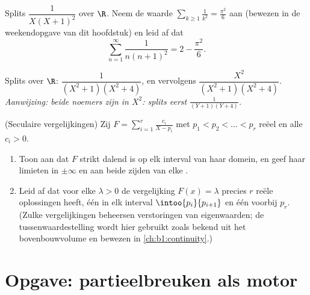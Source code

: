 \begin{exercise}[$\star\star$]\label{exo:b1:fractions:10}
Splits $\dfrac{1}{X(X+1)^2}$ over $\R$. Neem de waarde $\sum_{k \geq 1}
\frac1{k^2} = \frac{\pi^2}6$ aan (bewezen in de weekendopgave van dit
hoofdstuk) en leid af dat
\[
\sum_{n=1}^{\infty} \frac{1}{n(n+1)^2} = 2 - \frac{\pi^2}{6} .
\]
\end{exercise}

\begin{exercise}[$\star\star$]\label{exo:b1:fractions:11}
Splits over $\R$: $\dfrac{1}{(X^2+1)(X^2+4)}$, en vervolgens
$\dfrac{X^2}{(X^2+1)(X^2+4)}$. \emph{Aanwijzing: beide noemers zijn
 in $X^2$: splits eerst $\frac1{(Y+1)(Y+4)}$.}
\end{exercise}

\begin{exercise}[$\star\star\star$]\label{exo:b1:fractions:12}
(Seculaire vergelijkingen) Zij $F = \sum_{i=1}^{r} \frac{c_i}{X - p_i}$
met $p_1 < p_2 < \dots < p_r$ reëel en alle $c_i > 0$.
\begin{enumerate}
  \item Toon aan dat $F$ strikt dalend is op elk interval van haar
        domein, en geef haar limieten in $\pm\infty$ en aan beide zijden
        van elke .
  \item Leid af dat voor elke $\lambda > 0$ de vergelijking $F(x) =
        \lambda$ precies $r$ reële oplossingen heeft, één in elk
        interval $\intoo{p_i}{p_{i+1}}$ en één voorbij $p_r$. (Zulke
        vergelijkingen beheersen verstoringen van eigenwaarden; de
        tussenwaardestelling wordt hier gebruikt zoals bekend uit het
        bovenbouwvolume en bewezen in \cref{ch:b1:continuity}.)
\end{enumerate}
\end{exercise}

\section{Opgave: partieelbreuken als motor}

